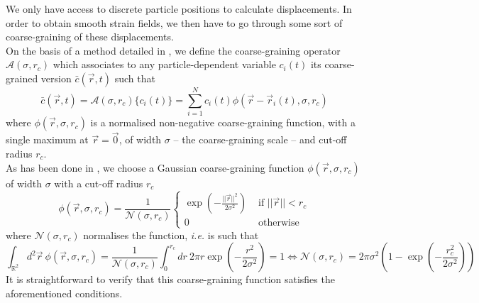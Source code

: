 \documentclass[class=report, float=false, crop=false]{standalone}
\begin{document}

We only have access to discrete particle positions to calculate displacements. In order to obtain smooth strain fields, we then have to go through some sort of coarse-graining of these displacements.\\

On the basis of a method detailed in \cite{goldhirsch2002microscopic}, we define the coarse-graining operator $\mathcal{A}(\sigma, r_c)$ which associates to any particle-dependent variable $c_i(t)$ its coarse-grained version $\bar{c}(\vec{r}, t)$ such that
\begin{equation}
\bar{c}(\vec{r}, t) = \mathcal{A}(\sigma, r_c)\{c_i(t)\} = \sum_{i=1}^N c_i(t) \phi(\vec{r}-\vec{r}_i(t), \sigma, r_c)
\end{equation}
where $\phi(\vec{r}, \sigma, r_c)$ is a normalised non-negative coarse-graining function, with a single maximum at $\vec{r} = \vec{0}$, of width $\sigma$ -- the coarse-graining scale -- and cut-off radius $r_c$.\\

As has been done in \cite{illing2016strain}, we choose a Gaussian coarse-graining function $\phi(\vec{r}, \sigma, r_c)$ of width $\sigma$ with a cut-off radius $r_c$
\begin{equation}
\phi(\vec{r}, \sigma, r_c) = \frac{1}{\mathcal{N}(\sigma, r_c)} \begin{cases} \exp\left(-\frac{||\vec{r}||^2}{2\sigma^2}\right) &\text{ if } ||\vec{r}|| < r_c \\ 0 & \text{ otherwise} \end{cases}
\end{equation}
where $\mathcal{N}(\sigma, r_c)$ normalises the function, \textit{i.e.} is such that
\begin{equation}
\int_{\mathbb{R}^2} d^2\vec{r}~ \phi(\vec{r}, \sigma, r_c) = \frac{1}{\mathcal{N}(\sigma, r_c)}\int_0^{r_c} dr~ 2 \pi r \exp\left(-\frac{r^2}{2\sigma^2}\right) = 1 \Leftrightarrow \mathcal{N}(\sigma, r_c) = 2\pi\sigma^2\left(1 - \exp\left(-\frac{r_c^2}{2\sigma^2}\right)\right)
\end{equation}
It is straightforward to verify that this coarse-graining function satisfies the aforementioned conditions.\\
\end{document}

